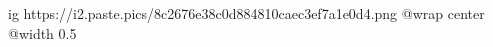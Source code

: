  
 
 
 
 

\ifcmt
  ig https://i2.paste.pics/8c2676e38c0d884810caec3ef7a1e0d4.png
  @wrap center
  @width 0.5
\fi
